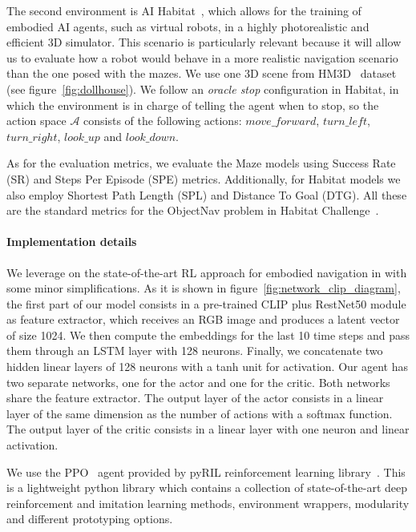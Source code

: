 The second environment is AI Habitat~\cite{szot2021}, which allows for the training of embodied AI agents, such as virtual robots, in a highly photorealistic and efficient 3D simulator.
This scenario is particularly relevant because it will allow us to evaluate how a robot would behave in a more realistic navigation scenario than the one posed with the mazes.
We use one 3D scene from HM3D~\cite{ramakrishnan2021} dataset (see figure~\ref{fig:dollhouse}).
We follow an \textit{oracle stop} configuration in Habitat, in which the environment is in charge of telling the agent when to stop, so the action space $\mathcal{A}$ consists of the following actions: $move\_forward$, $turn\_left$, $turn\_right$, $look\_up$ and $look\_down$.

As for the evaluation metrics, we evaluate the Maze models using Success Rate (SR) and Steps Per Episode (SPE) metrics.
Additionally, for Habitat models we also employ Shortest Path Length (SPL) and Distance To Goal (DTG).
All these are the standard metrics for the ObjectNav problem in Habitat Challenge~\cite{batra2020}.

\paragraph{Implementation details}
We leverage on the state-of-the-art RL approach for embodied navigation in \cite{khandelwal2022} with some minor simplifications.
As it is shown in figure~\ref{fig:network_clip_diagram}, the first part of our model consists in a pre-trained CLIP plus RestNet50 module as feature extractor, which receives an RGB image and produces a latent vector of size 1024.
We then compute the embeddings for the last 10 time steps and pass them through an LSTM layer with 128 neurons.
Finally, we concatenate two hidden linear layers of 128 neurons with a tanh unit for activation.
Our agent has two separate networks, one for the actor and one for the critic.
Both networks share the feature extractor.
The output layer of the actor consists in a linear layer of the same dimension as the number of actions with a softmax function.
The output layer of the critic consists in a linear layer with one neuron and linear activation.

We use the PPO~\cite{schulman2017} agent provided by pyRIL reinforcement learning library~\cite{pyRIL}.
This is a lightweight python library which contains a collection of state-of-the-art deep reinforcement and imitation learning methods, environment wrappers, modularity and different prototyping options.

